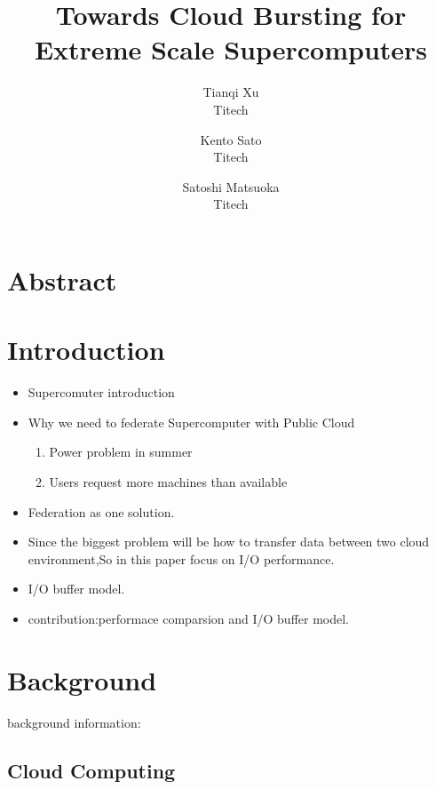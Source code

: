 \documentclass{article}
\begin{document}
	\title{Towards Cloud Bursting for Extreme Scale Supercomputers}
	\author{Tianqi Xu \\ Titech \and Kento Sato \\Titech \and Satoshi Matsuoka\\Titech}
	\date{}
\maketitle


\section*{Abstract}


\section{Introduction}
\begin{itemize}
	\item Supercomuter introduction
	
	\item Why we need to federate Supercomputer with Public Cloud
		\begin{enumerate}
			\item Power problem in summer %
			
			\item Users request more machines than available
		\end{enumerate}
	\item Federation as one solution. 
	
	\item Since the biggest problem will be how to transfer data between two cloud environment,So in this paper focus on I/O performance.
	
	\item I/O buffer model.

	\item contribution:performace comparsion and I/O buffer model.

\end{itemize}

\section{Background}
background information:
	\subsection{Cloud Computing}
\end{document}
